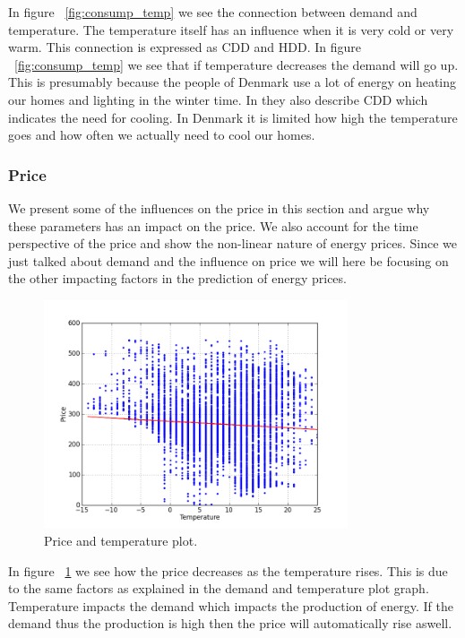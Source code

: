 In figure ~\ref{fig:consump_temp} we see the connection between demand and temperature. The temperature itself has an influence when it is very cold or very warm. This connection is expressed as CDD and HDD. In figure ~\ref{fig:consump_temp} we see that if temperature decreases the demand will go up. This is presumably because the people of Denmark use a lot of energy on heating our homes and lighting in the winter time. In \cite{19} they also describe CDD which indicates the need for cooling. In Denmark it is limited how high the temperature goes and how often we actually need to cool our homes.

\subsubsection{Price}
We present some of the influences on the price in this section and argue why these parameters has an impact on the price. We also account for the time perspective of the price and show the non-linear nature of energy prices. Since we just talked about demand and the influence on price we will here be focusing on the other impacting factors in the prediction of energy prices.

\begin{figure}[H]
\centering
\includegraphics[width=0.8\textwidth ,natwidth=410,natheight=237]{billeder/energy_price_plots/price_temp.png}
\caption{Price and temperature plot.}
\label{fig:price_temp}
\end{figure}

In figure ~\ref{fig:price_temp} we see how the price decreases as the temperature rises. This is due to the same factors as explained in the demand and temperature plot graph. Temperature impacts the demand which impacts the production of energy. If the demand thus the production is high then the price will automatically rise aswell.

